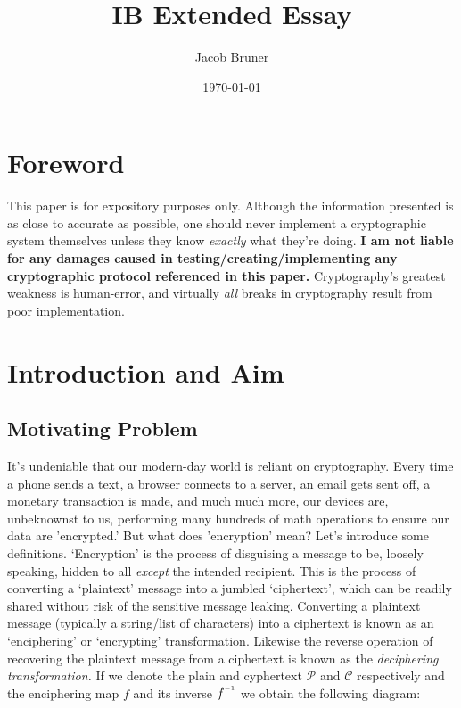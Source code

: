 \documentclass[11pt,a4paper]{article}
\author{Jacob Bruner}
\title{IB Extended Essay}
\date{\today}
\newcommand{\inv}{^{\raisebox{.2em}{$\scriptscriptstyle-1$}}}
\begin{document}
\maketitle
\tableofcontents

\pagebreak

\section*{Foreword}

This paper is for expository purposes only. Although the information presented is as close to accurate as possible, one should never implement a cryptographic system themselves unless they know \textit{\emph{exactly}} what they're doing. \textbf{I am not liable for any damages caused in testing/creating/implementing any cryptographic protocol referenced in this paper.} Cryptography's greatest weakness is human-error, and virtually \textit{all} breaks in cryptography result from poor implementation. 

\section{Introduction and Aim}
\subsection{Motivating Problem}
It's undeniable that our modern-day world is reliant on cryptography. Every time a phone sends a text, a browser connects to a server, an email gets sent off, a monetary transaction is made, and much much more, our devices are, unbeknownst to us, performing many hundreds of math operations to ensure our data are 'encrypted.' But what does 'encryption' mean? Let's introduce some definitions. ‘Encryption’ is the process of disguising a message to be, loosely speaking, hidden to all \textit{except} the intended recipient. This is the process of converting a ‘plaintext’ message into a jumbled ‘ciphertext’, which can be readily shared without risk of the sensitive message leaking. Converting a plaintext message (typically a string/list of characters) into a ciphertext is known as an ‘enciphering’ or ‘encrypting’ transformation. Likewise the reverse operation of recovering the plaintext message from a ciphertext is known as the \textit{deciphering transformation.}\autocite[54]{koblitz} If we denote the plain and cyphertext $\mathcal{P}$ and $\mathcal{C}$ respectively and the enciphering map $f$ and its inverse $f\inv$ we obtain the following diagram:
\end{document}
